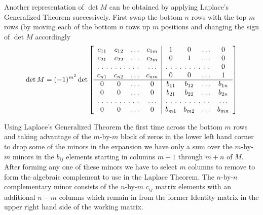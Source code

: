 Another representation of $\det M$ can be obtained by applying Laplace's Generalized Theorem successively. First swap the bottom $n$ rows with the top $m$ rows (by moving each of the bottom $n$ rows up $m$ positions and changing the sign of $\det M$ accordingly
\begin{equation}
\det M = (-1)^{m^2}
\det \left[
  \begin{array}{cccc|cccc}
  c_{11} &  c_{12} &\hdots & c_{1m} & 1 & 0& \hdots & 0\\
  c_{21} &  c_{22} &\hdots & c_{2m} & 0 & 1& \hdots & 0\\
  \hdotsfor[2]{3} & \hdots & \hdotsfor[2]{3} & 0\\
  c_{n1} &  c_{n2} &\hdots & c_{nm} & 0 & 0& \hdots& 1 \\
  \hline
  0 &  0 & \hdots & 0  & b_{11} & b_{12} & \hdots & b_{1n}\\
  0 & 0 & \hdots  & 0 & b_{21} & b_{22} & \hdots & b_{2n}\\
  \hdotsfor[2]{3} & \hdots &\hdotsfor[2]{3} & \hdots\\
  0 & 0 & \hdots  & 0 & b_{m1} & b_{m2} & \hdots & b_{mn}
\end{array} \right]
\end{equation}

Using Laplace's Generalized Theorem the first time across the bottom $m$ rows and taking advantage of the $m$-by-$m$ block of zeros in the lower left hand corner to drop some of the minors in the expansion we have only a sum over the $m$-by-$m$ minors in the $b_{ij}$ elements starting in columns $m+1$ through $m+n$ of $M$. After forming any one of these minors we have to select $m$ columns to remove to form the algebraic complement to use in the Laplace Theorem. The $n$-by-$n$ complementary minor consists of the $n$-by-$m$ $c_{ij}$ matrix elements with an additional $n-m$ columns which remain in from the former Identity matrix in the upper right hand side of the working matrix.\\

